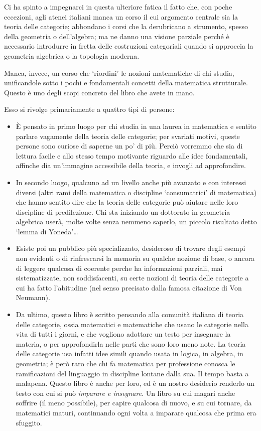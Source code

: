 Ci ha spinto a impegnarci in questa ulteriore fatica il fatto che, con poche eccezioni, agli atenei italiani manca un corso il cui argomento centrale sia la teoria delle categorie; abbondano i corsi che la derubricano a strumento, spesso della geometria o dell'algebra; ma ne danno una visione parziale perché è necessario introdurre in fretta delle costruzioni categoriali quando si approccia la geometria algebrica o la topologia moderna.

Manca, invece, un corso che `riordini' le nozioni matematiche di chi studia, unificandole sotto i pochi e fondamentali concetti della matematica strutturale. Questo è uno degli scopi concreto del libro che avete in mano.

Esso si rivolge primariamente a quattro tipi di persone:
\begin{itemize}
	\item \`E pensato in primo luogo per chi studia in una laurea in matematica e sentito parlare vagamente della teoria delle categorie; per svariati motivi, queste persone sono curiose di saperne un po' di più. Perciò vorremmo che sia di lettura facile e allo stesso tempo motivante riguardo alle idee fondamentali, affinche dia un'immagine accessibile della teoria, e invogli ad approfondire.
	\item In secondo luogo, qualcuno ad un livello anche più avanzato e con interessi diversi (altri rami della matematica o discipline `consumatrici' di matematica) che hanno sentito dire che la teoria delle categorie pu\`o aiutare nelle loro discipline di predilezione. Chi sta iniziando un dottorato in geometria algebrica userà, molte volte senza nemmeno saperlo, un piccolo risultato detto `lemma di Yoneda'\dots
	\item Esiste poi un pubblico pi\`u specializzato, desideroso di trovare degli esempi non evidenti o di rinfrescarsi la memoria su qualche nozione di base, o ancora di leggere qualcosa di coerente perche ha informazioni parziali, mai sistematizzate, non soddisfacenti, su certe nozioni di teoria delle categorie a cui ha fatto l'abitudine (nel senso precisato dalla famosa citazione di Von Neumann).
	\item Da ultimo, questo libro è scritto pensando alla comunità italiana di teoria delle categorie, ossia matematici e matematiche che usano le categorie nella vita di tutti i giorni, e che vogliono adottare un testo per insegnare la materia, o per approfondirla nelle parti che sono loro meno note. La teoria delle categorie usa infatti idee simili quando usata in logica, in algebra, in geometria; è però raro che chi fa matematica per professione conosca le ramificazioni del linguaggio in discipline lontane dalla sua. Il tempo basta a malapena. Questo libro è anche per loro, ed è un nostro desiderio renderlo un testo con cui si può \emph{imparare e insegnare}. Un libro su cui magari anche soffrire (il meno possibile), per capire qualcosa di nuovo, e su cui tornare, da matematici maturi, continuando ogni volta a imparare qualcosa che prima era sfuggito.
\end{itemize}
\Todo{}

